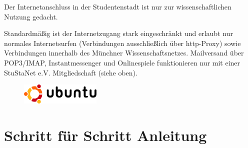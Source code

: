 \documentclass[a4paper,12pt]{scrartcl}
\begin{document}
Der Internetanschluss in der Studentenstadt ist nur zur wissenschaftlichen Nutzung gedacht.

Standardmäßig ist der Internetzugang stark eingeschränkt und erlaubt nur normales Internetsurfen (Verbindungen ausschließlich über http-Proxy) sowie Verbindungen innerhalb des Münchner Wissenschaftsnetzes. Mailversand über POP3/IMAP, Instantmessenger und Onlinespiele funktionieren nur mit einer StuStaNet e.V. Mitgliedschaft (siehe oben).


\newpage
\enlargethispage{20pt}

\begin{figure}[t!]
    \raggedleft
    \vspace{-20pt}
    \includegraphics[height=1cm,keepaspectratio]{Bilder/Ubuntu_logo}
    \vspace{-30pt}
\end{figure}

\section*{Schritt für Schritt Anleitung}
\end{document}
